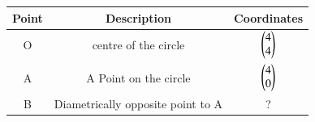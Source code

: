 \begin{tabular}[12pt]{ |c| c| c|}
    \hline
    \textbf{Point} & \textbf{Description}&\textbf{Coordinates}\\ 
    \hline
	O & centre of the circle&$\begin{pmatrix}4\\4\end{pmatrix}$\\
    \hline
	A & A Point on the circle & $\begin{pmatrix}4\\0\end{pmatrix}$\\
    \hline
	B & Diametrically opposite point to A & ? \\ 
    \hline
    \end{tabular}
